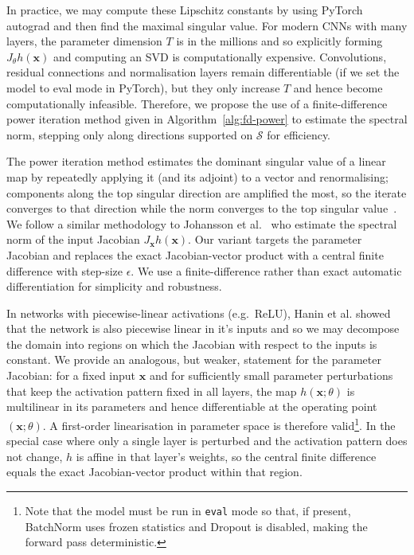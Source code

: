 \documentclass{article}
\theoremstyle{plain}
\theoremstyle{definition}
\theoremstyle{remark}
\begin{document}
In practice, we may compute these Lipschitz constants by using PyTorch autograd and then find the maximal singular value. For modern CNNs with many layers, the parameter dimension $T$ is in the millions and so explicitly forming $J_\theta h(\mathbf{x})$
and computing an SVD is computationally expensive. Convolutions, residual connections and normalisation layers
remain differentiable (if we set the model to eval mode in PyTorch), but they only increase $T$ and hence become computationally infeasible.  Therefore, we propose the use of a finite-difference power iteration method given in Algorithm~\ref{alg:fd-power} to estimate the spectral norm, stepping only along directions supported on $\mathcal S$ for efficiency.

 The power iteration method estimates the dominant singular value of a linear map by repeatedly applying it (and its adjoint) to a vector and renormalising; components along the top singular direction are amplified the most, so the iterate converges to that direction while the norm converges to the top singular value~\cite{golub_matrix_1996}.  We follow a similar methodology to Johansson et al.~\cite{johansson_exact_2022} who estimate the spectral norm of the input Jacobian $J_{\mathbf{x}} h(\mathbf{x})$. Our variant targets the parameter Jacobian and replaces the exact Jacobian-vector product  with a central finite difference with step-size $\epsilon$. We use a finite-difference rather than exact automatic differentiation for simplicity and robustness.

In networks with piecewise-linear activations (e.g.\ ReLU), Hanin et al. \cite{hanin_deep_2019} showed that the network is also piecewise linear in it's inputs and so we may decompose the domain into regions on which the Jacobian with respect to the inputs  is constant. We provide an analogous, but weaker, statement for the parameter Jacobian: 
for a fixed input $\textbf{x}$ and for sufficiently 
small parameter perturbations that keep the activation pattern fixed in all layers, the map $h(\textbf{x};\theta)$ is 
multilinear in its parameters and hence differentiable at the operating point $(\textbf{x};\theta)$. A first-order linearisation 
in parameter space is therefore valid\footnote{Note that the model must be run in \texttt{eval} mode so that, if present, BatchNorm 
uses frozen statistics and Dropout is disabled, making the forward pass deterministic.}. In the special case where 
only a single layer is perturbed and the activation pattern does not change, $h$ is affine 
in that layer’s weights, so the central finite difference equals the exact Jacobian-vector product within that region.
\end{document}
